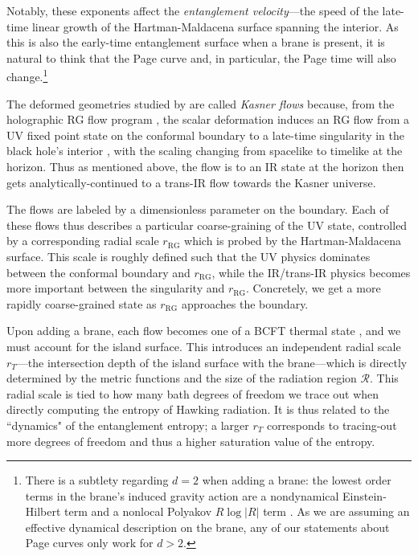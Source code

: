 \documentclass[12pt,a4paper]{article}
\begin{document}
Notably, these exponents affect the \textit{entanglement velocity}---the speed of the late-time linear growth of the Hartman-Maldacena surface spanning the interior. As this is also the early-time entanglement surface when a brane is present, it is natural to think that the Page curve and, in particular, the Page time will also change.\footnote{There is a subtlety regarding $d = 2$ when adding a brane: the lowest order terms in the brane's induced gravity action are a nondynamical Einstein-Hilbert term and a nonlocal Polyakov $R\log|R|$ term \cite{Chen:2020uac}. As we are assuming an effective dynamical description on the brane, any of our statements about Page curves only work for $d > 2$.}

The deformed geometries studied by \cite{Frenkel:2020ysx} are called \textit{Kasner flows} because, from the holographic RG flow program \cite{Balasubramanian:1999jd}, the scalar deformation induces an RG flow from a UV fixed point state on the conformal boundary to a late-time singularity in the black hole's interior \cite{Kiritsis:2016kog,Gursoy:2018umf}, with the scaling changing from spacelike to timelike at the horizon. Thus as mentioned above, the flow is to an IR state at the horizon then gets analytically-continued to a trans-IR flow towards the Kasner universe.

The flows are labeled by a dimensionless parameter on the boundary. Each of these flows thus describes a particular coarse-graining of the UV state, controlled by a corresponding radial scale $r_{\text{RG}}$ which is probed by the Hartman-Maldacena surface. This scale is roughly defined such that the UV physics dominates between the conformal boundary and $r_{\text{RG}}$, while the IR/trans-IR physics becomes more important between the singularity and $r_{\text{RG}}$. Concretely, we get a more rapidly coarse-grained state as $r_{\text{RG}}$ approaches the boundary.

Upon adding a brane, each flow becomes one of a BCFT thermal state \cite{Rozali:2019day,Sato:2020upl}, and we must account for the island surface. This introduces an independent radial scale $r_T$---the intersection depth of the island surface with the brane---which is directly determined by the metric functions and the size of the radiation region $\mathcal{R}$. This radial scale is tied to how many bath degrees of freedom we trace out when directly computing the entropy of Hawking radiation. It is thus related to the ``dynamics" of the entanglement entropy; a larger $r_T$ corresponds to tracing-out more degrees of freedom and thus a higher saturation value of the entropy.
\end{document}

